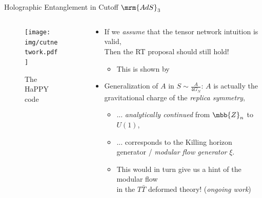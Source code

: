 \documentclass[aspectratio=169,10pt
	,noamsthm
]{beamer}
\begin{document}
\begin{frame}{Holographic Entanglement in Cutoff $\mrm{AdS}_3$}{%
	\textcite{Lewkowycz:2019xse}%
}
	\begin{columns}
	\begin{column}{.35\textwidth}
		\begin{figure}[!h]
		\centering
		\texttt{[image: img/cutnetwork.pdf]}
		\caption{The HaPPY code \cite{Pastawski:2015qua,Harlow:2018fse}}
		\end{figure}
	\end{column}
	\begin{column}{.65\textwidth}
		\begin{itemize}
		\item If we \textit{assume} that the tensor network intuition is valid,\\
		Then the RT proposal should still hold!
		
			\begin{itemize}
			\item This is shown by \textcite{Lewkowycz:2019xse}
			\end{itemize}
		
	\pause
		
		\item Generalization of $A$ in $S \sim \frac{A}{4G_N}$:
		$A$ is actually the gravitational charge of the \textit{replica symmetry},
		
			\begin{itemize}
			\item ... \textit{analytically continued} from $\mbb{Z}_n$ to $U(1)$,
		\vspace{-.5ex}
			\item ... corresponds to the Killing horizon generator / \textit{modular flow generator} $\xi$. 
			
			\item This would in turn give us a hint of the modular flow\\
			 in the $T\bar{T}$ deformed theory! (\textit{ongoing work})
			
			\end{itemize}
		
		\end{itemize}
	\end{column}
	\end{columns}
\end{frame}
\end{document}
